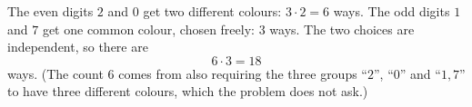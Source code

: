 The even digits $2$ and $0$ get two different colours: $3\cdot2=6$ ways. The odd digits $1$ and $7$ get one common colour, chosen freely: $3$ ways. The two choices are independent, so there are
\[
6\cdot3=\boxed{18}
\]
ways. (The count $6$ comes from also requiring the three groups ``$2$'', ``$0$'' and ``$1,7$'' to have three different colours, which the problem does not ask.)
